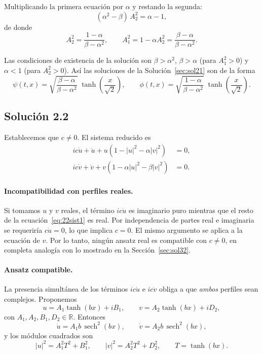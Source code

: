 \documentclass[letterpaper,11pt]{exam}
\newcommand{\sech}{\operatorname{sech}}
\theoremstyle{plain}
\begin{document}
Multiplicando la primera ecuación por $\alpha$ y restando la segunda:
\[
  (\alpha^2 - \beta)\,A_2^2 = \alpha - 1,
\]
de donde
\[
  A_2^2 = \frac{1 - \alpha}{\beta - \alpha^2},
  \qquad
  A_1^2 = 1 - \alpha A_2^2 = \frac{\beta - \alpha}{\beta - \alpha^2}.
\]

Las condiciones de existencia de la solución son $\beta > \alpha^2$, $\beta > \alpha$
(para $A_1^2 > 0$) y $\alpha < 1$ (para $A_2^2 > 0$).
Así las soluciones de la Solución~\ref{sec:sol21} son de la forma
\[
  \psi(t,x) = \sqrt{\frac{\beta-\alpha}{\beta-\alpha^2}}\;\tanh\!\left(\frac{x}{\sqrt{2}}\right),
  \qquad
  \phi(t,x) = \sqrt{\frac{1-\alpha}{\beta-\alpha^2}}\;\tanh\!\left(\frac{x}{\sqrt{2}}\right).
\]

\subsection{Solución 2.2}\label{sec:sol22}

Establecemos que $c \neq 0$. El sistema reducido es
\begin{align}
  ic\dot{u} + \ddot{u} + u(1 - |u|^2 - \alpha|v|^2) &= 0, \label{eq:22sist1}\\
  ic\dot{v} + \ddot{v} + v(1 - \alpha|u|^2 - \beta|v|^2) &= 0. \label{eq:22sist2}
\end{align}

\paragraph{Incompatibilidad con perfiles reales.}
Si tomamos $u$ y $v$ reales, el término $ic\dot{u}$ es imaginario puro mientras que el resto
de la ecuación~\eqref{eq:22sist1} es real. Por independencia de partes real e imaginaria se
requeriría $c\dot{u} = 0$, lo que implica $c = 0$. El mismo argumento se aplica a la ecuación de $v$. Por lo tanto, ningún ansatz real es compatible con $c \neq 0$, en completa analogía con lo mostrado en la Sección~\ref{sec:sol32}.

\paragraph{Ansatz compatible.}
La presencia simultánea de los términos $ic\dot{u}$ e $ic\dot{v}$ obliga a que \emph{ambos}
perfiles sean complejos. Proponemos
\[
  u = A_1\tanh(bx) + iB_1,
  \qquad
  v = A_2\tanh(bx) + iD_2,
\]
con $A_1, A_2, B_1, D_2 \in \mathbb{R}$. Entonces
\[
  \dot{u} = A_1 b\,\sech^2(bx), \qquad
  \dot{v} = A_2 b\,\sech^2(bx),
\]
y los módulos cuadrados son
\[
  |u|^2 = A_1^2 T^2 + B_1^2, \qquad
  |v|^2 = A_2^2 T^2 + D_2^2, \qquad T = \tanh(bx).
\]
\end{document}
